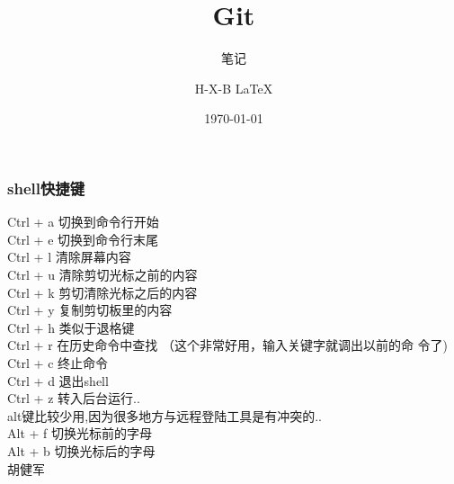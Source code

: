 \documentclass{beamer}
\begin{document}
\begin{CJK}{UTF8}{gkai}

    \title{Git}
  \subtitle{笔记}
  \author{H-X-B \LaTeX{} }
  \date{\today}

  \frame{\titlepage}

  \begin{frame}\frametitle{shell快捷键}
    Ctrl + a 切换到命令行开始\\
    Ctrl + e 切换到命令行末尾\\
    Ctrl + l 清除屏幕内容\\
    Ctrl + u 清除剪切光标之前的内容\\
    Ctrl + k 剪切清除光标之后的内容\\
    Ctrl + y 复制剪切板里的内容\\
    Ctrl + h 类似于退格键\\
    Ctrl + r 在历史命令中查找 （这个非常好用，输入关键字就调出以前的命
 令了)\\
    Ctrl + c 终止命令\\
    Ctrl + d 退出shell\\
    Ctrl + z 转入后台运行..\\
    alt键比较少用,因为很多地方与远程登陆工具是有冲突的..\\
    Alt + f 切换光标前的字母\\
    Alt + b 切换光标后的字母\\
    \Huge{胡健军}
  \end{frame}

\end{CJK}
\end{document}
